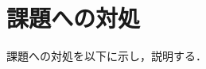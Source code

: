 \documentclass[tanilab-enum]{graduate}
\begin{document}
\section{課題への対処}
課題への対処を以下に示し，説明する．
\end{document}
